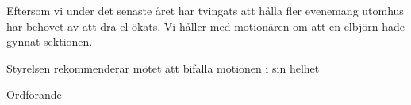 \documentclass[../_main/handlingar.tex]{subfiles}
\begin{document}
\motionssvar

Eftersom vi under det senaste året har tvingats att hålla fler evenemang utomhus har behovet av att dra el ökats. Vi håller med motionären om att en elbjörn hade gynnat sektionen.

Styrelsen rekommenderar mötet att bifalla motionen i sin helhet 


\begin{signatures}{1}
    \ist
    \signature{\ordf}{Ordförande}
\end{signatures}
\end{document}

